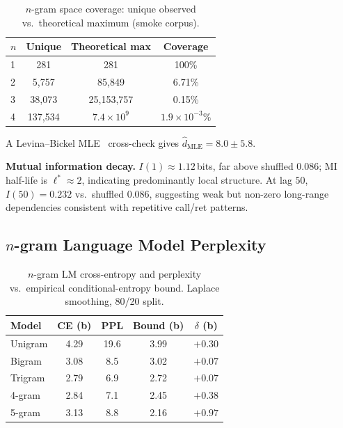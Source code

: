 \documentclass[conference]{IEEEtran}
\begin{document}
\begin{table}[t]
\centering
\caption{$n$-gram space coverage: unique observed vs.\ theoretical
         maximum (smoke corpus).}
\label{tab:coverage}
\begin{tabular}{@{}lccc@{}}
\toprule
$n$ & \textbf{Unique} & \textbf{Theoretical max} & \textbf{Coverage} \\
\midrule
1 & 281      & 281              & 100\%       \\
2 & 5{,}757  & 85{,}849         & 6.71\%      \\
3 & 38{,}073 & 25{,}153{,}757   & 0.15\%      \\
4 & 137{,}534& $7.4{\times}10^9$& $1.9{\times}10^{-3}\%$ \\
\bottomrule
\end{tabular}
\end{table}  A Levina--Bickel
MLE~\cite{levina2005mle} cross-check gives
$\hat{d}_{\mathrm{MLE}}{=}8.0\pm5.8$.

\textbf{Mutual information decay.}
$I(1){\approx}1.12$\,bits, far above shuffled $0.086$; MI half-life is
$\ell^{*}{\approx}2$, indicating predominantly local structure.  At
lag $50$, $I(50){=}0.232$ vs.\ shuffled $0.086$, suggesting weak but
non-zero long-range dependencies consistent with repetitive call/ret
patterns.

\subsection{$n$-gram Language Model Perplexity}
\label{sec:lm}

\begin{table}[t]
\centering
\caption{$n$-gram LM cross-entropy and perplexity vs.\ empirical
         conditional-entropy bound.  Laplace smoothing, 80/20 split.}
\label{tab:lm}
\begin{tabular}{@{}lcccc@{}}
\toprule
\textbf{Model} & \textbf{CE (b)} & \textbf{PPL} & \textbf{Bound (b)} & $\delta$ (b) \\
\midrule
Unigram & 4.29 & 19.6 & 3.99 & $+0.30$ \\
Bigram  & 3.08 &  8.5 & 3.02 & $+0.07$ \\
Trigram & 2.79 &  6.9 & 2.72 & $+0.07$ \\
4-gram  & 2.84 &  7.1 & 2.45 & $+0.38$ \\
5-gram  & 3.13 &  8.8 & 2.16 & $+0.97$ \\
\bottomrule
\end{tabular}
\end{table}
\end{document}
